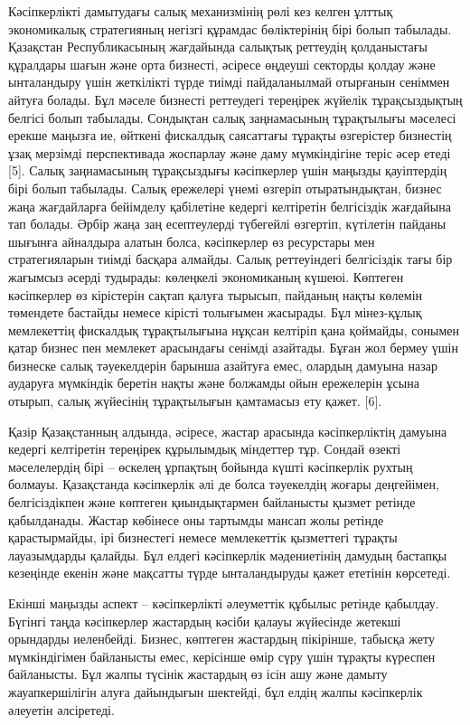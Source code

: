 Кәсіпкерлікті дамытудағы салық механизмінің рөлі кез келген ұлттық
экономикалық стратегияның негізгі құрамдас бөліктерінің бірі болып
табылады. Қазақстан Республикасының жағдайында салықтық реттеудің
қолданыстағы құралдары шағын және орта бизнесті, әсіресе өңдеуші
секторды қолдау және ынталандыру үшін жеткілікті түрде тиімді
пайдаланылмай отырғанын сеніммен айтуға болады. Бұл мәселе бизнесті
реттеудегі тереңірек жүйелік тұрақсыздықтың белгісі болып табылады.
Сондықтан салық заңнамасының тұрақтылығы мәселесі ерекше маңызға ие,
өйткені фискалдық саясаттағы тұрақты өзгерістер бизнестің ұзақ мерзімді
перспективада жоспарлау және даму мүмкіндігіне теріс әсер етеді {[}5{]}.
Салық заңнамасының тұрақсыздығы кәсіпкерлер үшін маңызды қауіптердің
бірі болып табылады. Салық ережелері үнемі өзгеріп отыратындықтан,
бизнес жаңа жағдайларға бейімделу қабілетіне кедергі келтіретін
белгісіздік жағдайына тап болады. Әрбір жаңа заң есептеулерді түбегейлі
өзгертіп, күтілетін пайданы шығынға айналдыра алатын болса, кәсіпкерлер
өз ресурстары мен стратегияларын тиімді басқара алмайды. Салық
реттеуіндегі белгісіздік тағы бір жағымсыз әсерді тудырады: көлеңкелі
экономиканың күшеюі. Көптеген кәсіпкерлер өз кірістерін сақтап қалуға
тырысып, пайданың нақты көлемін төмендете бастайды немесе кірісті
толығымен жасырады. Бұл мінез-құлық мемлекеттің фискалдық тұрақтылығына
нұқсан келтіріп қана қоймайды, сонымен қатар бизнес пен мемлекет
арасындағы сенімді азайтады. Бұған жол бермеу үшін бизнеске салық
тәуекелдерін барынша азайтуға емес, олардың дамуына назар аударуға
мүмкіндік беретін нақты және болжамды ойын ережелерін ұсына отырып,
салық жүйесінің тұрақтылығын қамтамасыз ету қажет. {[}6{]}.

Қазір Қазақстанның алдында, әсіресе, жастар арасында кәсіпкерліктің
дамуына кедергі келтіретін тереңірек құрылымдық міндеттер тұр. Сондай
өзекті мәселелердің бірі -- өскелең ұрпақтың бойында күшті кәсіпкерлік
рухтың болмауы. Қазақстанда кәсіпкерлік әлі де болса тәуекелдің жоғары
деңгейімен, белгісіздікпен және көптеген қиындықтармен байланысты қызмет
ретінде қабылданады. Жастар көбінесе оны тартымды мансап жолы ретінде
қарастырмайды, ірі бизнестегі немесе мемлекеттік қызметтегі тұрақты
лауазымдарды қалайды. Бұл елдегі кәсіпкерлік мәдениетінің дамудың
бастапқы кезеңінде екенін және мақсатты түрде ынталандыруды қажет
ететінін көрсетеді.

Екінші маңызды аспект -- кәсіпкерлікті әлеуметтік құбылыс ретінде
қабылдау. Бүгінгі таңда кәсіпкерлер жастардың кәсіби қалауы жүйесінде
жетекші орындарды иеленбейді. Бизнес, көптеген жастардың пікірінше,
табысқа жету мүмкіндігімен байланысты емес, керісінше өмір сүру үшін
тұрақты күреспен байланысты. Бұл жалпы түсінік жастардың өз ісін ашу
және дамыту жауапкершілігін алуға дайындығын шектейді, бұл елдің жалпы
кәсіпкерлік әлеуетін әлсіретеді.

